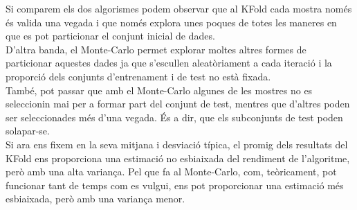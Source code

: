 \documentclass{article} %
\begin{document}
{	Si comparem els dos algorismes podem observar que al KFold cada mostra només és valida una vegada i que només explora unes poques de totes les maneres en que es pot particionar el conjunt inicial de dades. \\

	D'altra banda, el Monte-Carlo permet explorar moltes altres formes de particionar aquestes dades ja que s'escullen aleatòriament a cada iteració i la proporció dels conjunts d'entrenament i de test no està fixada. \\

	També, pot passar que amb el Monte-Carlo algunes de les mostres no es seleccionin mai per a formar part del conjunt de test, mentres que d'altres poden ser seleccionades més d'una vegada. És a dir, que els subconjunts de test poden solapar-se. \\

	Si ara ens fixem en la seva mitjana i desviació típica, el promig dels resultats del KFold ens proporciona una estimació no esbiaixada del rendiment de l'algoritme, però amb una alta variança. Pel que fa al Monte-Carlo, com, teòricament, pot funcionar tant de temps com es vulgui, ens pot proporcionar una estimació més esbiaixada, però amb una variança menor. \\


}
\end{document}
